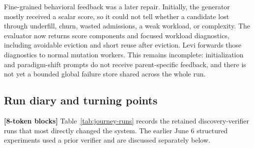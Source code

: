 \documentclass[11pt]{article}
\newcommand{\blocktag}[1]{\textbf{\color{navy}[#1-token blocks]}}
\begin{document}
Fine-grained behavioral feedback was a later repair.  Initially, the generator mostly
received a scalar score, so it could not tell whether a candidate lost through
underfill, churn, wasted admissions, a weak workload, or complexity.  The evaluator
now returns score components and focused workload diagnostics, including avoidable
eviction and short reuse after eviction.  Levi forwards those diagnostics to normal
mutation workers.  This remains incomplete: initialization and paradigm-shift prompts
do not receive parent-specific feedback, and there is not yet a bounded global failure
store shared across the whole run.

\subsection{Run diary and turning points}

\blocktag{8} Table~\ref{tab:journey-runs} records the retained discovery-verifier runs
that most directly changed the system.  The earlier June 6 structured experiments used a prior
verifier and are discussed separately below.
\end{document}
